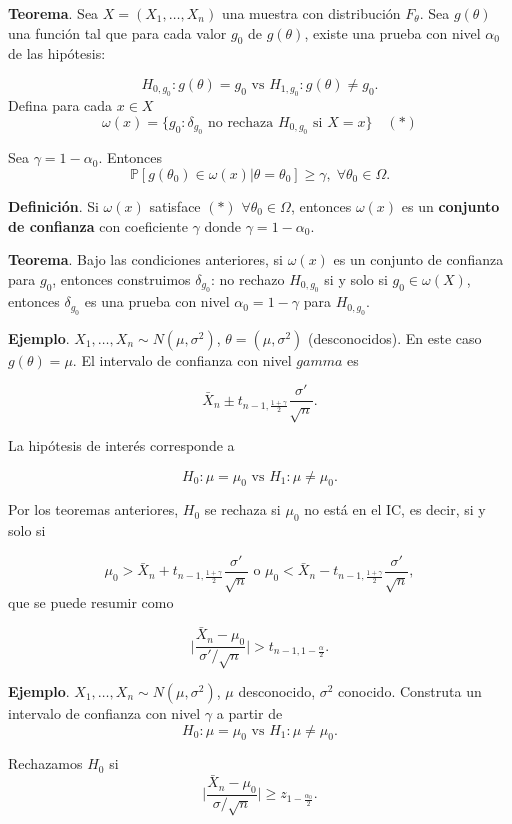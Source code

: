 \documentclass[
  12pt,
]{book}
\begin{document}
\textbf{Teorema}. Sea \(X = (X_1,\dots,X_n)\) una muestra con distribución \(F_\theta\). Sea \(g(\theta)\) una función tal que para cada valor \(g_0\) de \(g(\theta)\), existe una prueba con nivel \(\alpha_0\) de las hipótesis:

\[H_{0,g_0}: g(\theta) = g_0 \text{ vs } H_{1,g_0}: g(\theta) \neq g_0. \]
Defina para cada \(x\in X\)
\[\omega(x) = \{g_0: \delta_{g_0} \text{ no rechaza }H_{0,g_0}\text{ si }X=x\} \quad (*)\]

Sea \(\gamma = 1-\alpha_0\). Entonces
\[\mathbb P[g(\theta_0)\in \omega(x)|\theta = \theta_0 ] \geq \gamma, \;\forall \theta_0 \in \Omega.\]

\textbf{Definición}. Si \(\omega(x)\) satisface \((*)\) \(\forall \theta_0 \in \Omega\), entonces \(\omega(x)\) es un \textbf{conjunto de confianza} con coeficiente \(\gamma\) donde \(\gamma = 1-\alpha_0\).

\textbf{Teorema}. Bajo las condiciones anteriores, si \(\omega(x)\) es un conjunto de confianza para \(g_0\), entonces construimos \(\delta_{g_0}\): no rechazo \(H_{0,g_0}\) si y solo si \(g_0 \in \omega(X)\), entonces \(\delta_{g_0}\) es una prueba con nivel \(\alpha_0 = 1-\gamma\) para \(H_{0,g_0}\).

\textbf{Ejemplo}. \(X_1,\dots,X_n\sim N(\mu,\sigma^2)\), \(\theta = (\mu,\sigma^2)\) (desconocidos). En este caso \(g(\theta) = \mu\). El intervalo de confianza con nivel \(gamma\) es

\[\bar X_n\pm t_{n-1,\frac{1+\gamma}2}\dfrac{\sigma'}{\sqrt n}.\]

La hipótesis de interés corresponde a

\[ H_0: \mu = \mu_0 \text{ vs } H_1: \mu \ne \mu_0.\]

Por los teoremas anteriores, \(H_0\) se rechaza si \(\mu_0\) no está en el IC, es decir, si y solo si

\[\mu_0 > \bar X_n+ t_{n-1,\frac{1+\gamma}2}\dfrac{\sigma'}{\sqrt n} \text{ o } \mu_0 < \bar X_n- t_{n-1,\frac{1+\gamma}2}\dfrac{\sigma'}{\sqrt n},\]
que se puede resumir como

\[\bigg|\dfrac{\bar X_n-\mu_0}{\sigma'/\sqrt n}\bigg|>t_{n-1,1-\frac{\alpha}2}.\]

\textbf{Ejemplo}. \(X_1,\dots,X_n\sim N(\mu,\sigma^2)\), \(\mu\) desconocido, \(\sigma^2\) conocido. Construta un intervalo de confianza con nivel \(\gamma\) a partir de \[ H_0: \mu = \mu_0 \text{ vs } H_1: \mu \ne \mu_0.\]

Rechazamos \(H_0\) si
\[\bigg|\dfrac{\bar X_n-\mu_0}{\sigma/\sqrt n}\bigg|\geq z_{1-\frac{\alpha_0}2}.\]
\end{document}
